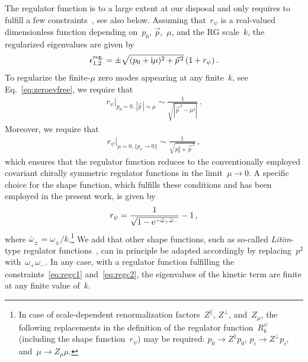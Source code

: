 \documentclass[prd,english,preprintnumbers,amsmath,amssymb,nofootinbib,twocolumn,superscriptaddress]{revtex4-1}
\newcommand{\be}{\begin{eqnarray}}
\newcommand{\ee}{\end{eqnarray}}
\begin{document}
{{The regulator function is to a large extent at our disposal and 
only requires to fulfill a few constraints~\cite{Wetterich:1992yh}, see also below.
Assuming that~$r_{\psi}$ is 
a real-valued dimensionless function depending on~$p_0$, $\vec{p}$,~$\mu$, and the RG scale~$k$, {the regularized
eigenvalues are given by
%
\be
\epsilon_{1,2}^{\text{reg.}}= \pm \sqrt{ (p_0+{\rm i}\mu)^2 +\vec{p}^{\,2}}\, (1+r_{\psi})\,.
\ee
%
To} regularize the finite-$\mu$ zero modes appearing at any finite~$k$, see Eq.~\eqref{eq:zeroevfree}, we require that
%
\be
r_{\psi}\big|_{p_0=0\,, |\vec{p}^{\,}|\approx \mu} \sim \frac{1}{\sqrt{|\vec{p}^{\,2} -\mu^2|}}\,.\label{eq:regc1}
\ee
%
Moreover, we require that
%
\be
r_{\psi}\big|_{\mu=0,\{p_{\nu}\to 0\}} \sim \frac{1}{\sqrt{p_0^2+\vec{p}^{\,2}}}\,,\label{eq:regc2}
\ee
%
which ensures that the regulator function reduces to the conventionally employed covariant chirally symmetric
regulator functions in the limit~$\mu\to 0$. A specific choice for the shape function, which fulfills these 
conditions and has been employed in the present work, is given by
%
\be
r_{\psi} = \frac{1}{\sqrt{1-{\rm e}^{-\bar{\omega}_+ \bar{\omega}_-}}} - 1\,,\label{eq:Rcv2}
\ee
%
where $\bar{\omega}_{\pm} =\omega_{\pm}/k$.\footnote{In case of scale-dependent renormalization factors~$Z^{\parallel}$, $Z^{\perp}$, and~$Z_{\mu}$, the following
replacements in the definition of the regulator function~$R^{\psi}_k$ (including the shape function~$r_{\psi}$) may be required: $p_0\to Z^{\parallel}p_0$, $p_i\to Z^{\perp}p_i$,
and~$\mu \to Z_{\mu}\mu$.} We add that other shape functions, such as so-called {\it Litim}-type regulator 
functions~\cite{Litim:2000ci,Litim:2001fd,Litim:2001up}, can in principle be adapted accordingly by replacing~$p^2$ 
with~${\omega}_{+} {\omega}_{-}$.
In any case, with a regulator function fulfilling the constraints~\eqref{eq:regc1} and~\eqref{eq:regc2}, 
the eigenvalues of the kinetic term are finite at any finite value of~$k$.

}}
\end{document}
